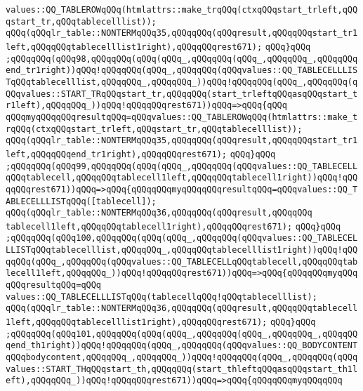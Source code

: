\verb|values::QQ_TABLEROWqQQq(htmlattrs::make_trqQQq(ctxqQQqstart_trleft,qQQqstart_tr,qQQqtablecelllist));|\newline
\verb|qQQq(qQQqlr_table::NONTERMqQQq35,qQQqqQQq(qQQqresult,qQQqqQQqstart_tr1left,qQQqqQQqtablecelllist1right),qQQqqQQqrest671);|\newline
\verb|qQQq}qQQq|\newline
\verb|;qQQqqQQq(qQQq98,qQQqqQQq(qQQq(qQQq_,qQQqqQQq(qQQq_,qQQqqQQq_,qQQqqQQqend_tr1right))qQQq!qQQqqQQq(qQQq_,qQQqqQQq(qQQqvalues::QQ_TABLECELLLISTqQQqtablecelllist,qQQqqQQq_,qQQqqQQq_))qQQq!qQQqqQQq(qQQq_,qQQqqQQq(qQQqvalues::START_TRqQQqstart_tr,qQQqqQQq(start_trleftqQQqasqQQqstart_tr1left),qQQqqQQq_))qQQq!qQQqqQQqrest671))qQQq=>qQQq{qQQq|\newline
\verb|qQQqmyqQQqqQQqresultqQQq=qQQqvalues::QQ_TABLEROWqQQq(htmlattrs::make_trqQQq(ctxqQQqstart_trleft,qQQqstart_tr,qQQqtablecelllist));|\newline
\verb|qQQq(qQQqlr_table::NONTERMqQQq35,qQQqqQQq(qQQqresult,qQQqqQQqstart_tr1left,qQQqqQQqend_tr1right),qQQqqQQqrest671);|\newline
\verb|qQQq}qQQq|\newline
\verb|;qQQqqQQq(qQQq99,qQQqqQQq(qQQq(qQQq_,qQQqqQQq(qQQqvalues::QQ_TABLECELLqQQqtablecell,qQQqqQQqtablecell1left,qQQqqQQqtablecell1right))qQQq!qQQqqQQqrest671))qQQq=>qQQq{qQQqqQQqmyqQQqqQQqresultqQQq=qQQqvalues::QQ_TABLECELLLISTqQQq([tablecell]);|\newline
\verb|qQQq(qQQqlr_table::NONTERMqQQq36,qQQqqQQq(qQQqresult,qQQqqQQq|\newline
\verb|tablecell1left,qQQqqQQqtablecell1right),qQQqqQQqrest671);|\newline
\verb|qQQq}qQQq|\newline
\verb|;qQQqqQQq(qQQq100,qQQqqQQq(qQQq(qQQq_,qQQqqQQq(qQQqvalues::QQ_TABLECELLLISTqQQqtablecelllist,qQQqqQQq_,qQQqqQQqtablecelllist1right))qQQq!qQQqqQQq(qQQq_,qQQqqQQq(qQQqvalues::QQ_TABLECELLqQQqtablecell,qQQqqQQqtablecell1left,qQQqqQQq_))qQQq!qQQqqQQqrest671))qQQq=>qQQq{qQQqqQQqmyqQQqqQQqresultqQQq=qQQq|\newline
\verb|values::QQ_TABLECELLLISTqQQq(tablecellqQQq!qQQqtablecelllist);|\newline
\verb|qQQq(qQQqlr_table::NONTERMqQQq36,qQQqqQQq(qQQqresult,qQQqqQQqtablecell1left,qQQqqQQqtablecelllist1right),qQQqqQQqrest671);|\newline
\verb|qQQq}qQQq|\newline
\verb|;qQQqqQQq(qQQq101,qQQqqQQq(qQQq(qQQq_,qQQqqQQq(qQQq_,qQQqqQQq_,qQQqqQQqend_th1right))qQQq!qQQqqQQq(qQQq_,qQQqqQQq(qQQqvalues::QQ_BODYCONTENTqQQqbodycontent,qQQqqQQq_,qQQqqQQq_))qQQq!qQQqqQQq(qQQq_,qQQqqQQq(qQQqvalues::START_THqQQqstart_th,qQQqqQQq(start_thleftqQQqasqQQqstart_th1left),qQQqqQQq_))qQQq!qQQqqQQqrest671))qQQq=>qQQq{qQQqqQQqmyqQQqqQQq|\newline
